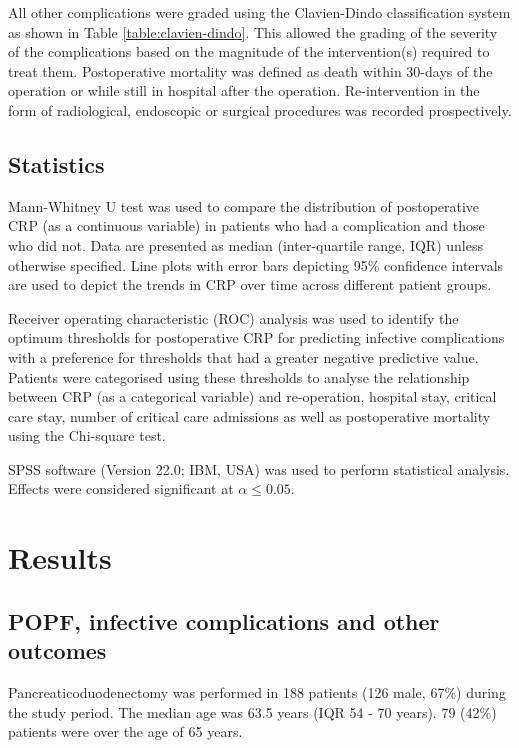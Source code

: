 All other complications were graded using the Clavien-Dindo classification system as shown in Table \ref{table:clavien-dindo}. This allowed the grading of the severity of the complications based on the magnitude of the intervention(s) required to treat them. Postoperative mortality was defined as death within 30-days of the operation or while still in hospital after the operation. Re-intervention in the form of radiological, endoscopic or surgical procedures was recorded prospectively.

\subsection{Statistics}
Mann-Whitney U test was used to compare the distribution of postoperative CRP (as a continuous variable) in patients who had a complication and those who did not. Data are presented as median (inter-quartile range, IQR) unless otherwise specified. Line plots with error bars depicting 95\% confidence intervals are used to depict the trends in CRP over time across different patient groups. 

Receiver operating characteristic (ROC) analysis \parencite{robertson_use_1981,zweig_receiver-operating_1993} was used to identify the optimum thresholds for postoperative CRP for predicting infective complications with a preference for thresholds that had a greater negative predictive value. Patients were categorised using these thresholds to analyse the relationship between CRP (as a categorical variable) and re-operation, hospital stay, critical care stay, number of critical care admissions as well as postoperative mortality using the Chi-square test. 

SPSS software (Version 22.0; IBM, USA) was used to perform statistical analysis. Effects were considered significant at $\alpha \leq0.05$. 



\section{Results}
\subsection{POPF, infective complications and other outcomes}
Pancreaticoduodenectomy was performed in 188 patients (126 male, 67\%) during the study period. The median age was 63.5 years (IQR 54 - 70 years). 79 (42\%) patients were over the age of 65 years. 

